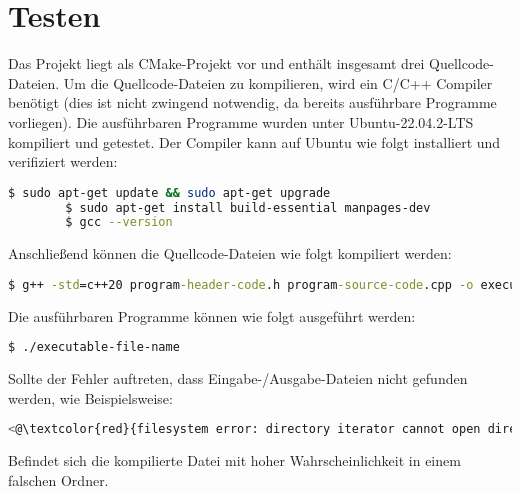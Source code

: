\documentclass[a4paper,10pt,ngerman]{scrartcl}
\begin{document}
    \section{Testen}\label{sec:testen}
    Das Projekt liegt als CMake-Projekt vor und enthält insgesamt drei Quellcode-Dateien.
    Um die Quellcode-Dateien zu kompilieren, wird ein C/C++ Compiler benötigt
    (dies ist nicht zwingend notwendig, da bereits ausführbare Programme vorliegen).
    Die ausführbaren Programme wurden unter Ubuntu-22.04.2-LTS kompiliert und getestet.
    \newpage
    Der Compiler kann auf Ubuntu wie folgt installiert und verifiziert werden:
    \begin{lstlisting}[language=bash,label={lst:install}]
        $ sudo apt-get update && sudo apt-get upgrade
        $ sudo apt-get install build-essential manpages-dev
        $ gcc --version
    \end{lstlisting}
    Anschließend können die Quellcode-Dateien wie folgt kompiliert werden:
    \begin{lstlisting}[language=cmd,label={lst:compile}]
        $ g++ -std=c++20 program-header-code.h program-source-code.cpp -o executable-file-name
    \end{lstlisting}
    Die ausführbaren Programme können wie folgt ausgeführt werden:
    \begin{lstlisting}[language=bash,label={lst:run}]
        $ ./executable-file-name
    \end{lstlisting}
    Sollte der Fehler auftreten, dass Eingabe-/Ausgabe-Dateien nicht gefunden werden,
    wie Beispielsweise:
    \begin{lstlisting}[language=bash,label={lst:error},color=blue]
       <@\textcolor{red}{filesystem error: directory iterator cannot open directory: No such file or directory}@>
    \end{lstlisting}
    Befindet sich die kompilierte Datei mit hoher Wahrscheinlichkeit in einem falschen Ordner.
\end{document}
